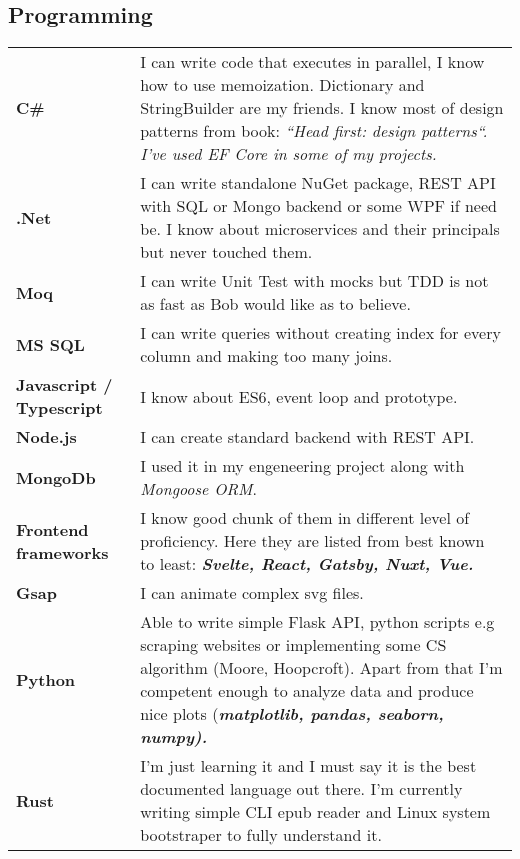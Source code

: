 \documentclass[10pt]{article}
\renewcommand{\arraystretch}{0}
\begin{document}
\subsection{Programming}
\renewcommand{\arraystretch}{2.5}
\begin{table}[H]
    \begin{tabularx}{\textwidth}{@{}l X}
         \textbf{C\#} & I can write code that executes in parallel, I know how to use memoization. Dictionary and StringBuilder are my friends. I know most of design patterns from book: \em ``Head first: design patterns``. I've used EF Core in some of my projects.\\
         \textbf{.Net} & I can write standalone NuGet package, REST API with SQL or Mongo backend or some WPF if need be. I know about microservices and their principals but never touched them. \\
         \textbf{Moq} & I can write Unit Test with mocks but TDD is not as fast as Bob would like as to believe.  \\
         \textbf{MS SQL} & I can write queries without creating index for every column and making too many joins. \\
	 \textbf{Javascript / Typescript} & I know about ES6, event loop and prototype.\\
	 \textbf{Node.js} & I can create standard backend with REST API.\\
         \textbf{MongoDb} & I used it in my engeneering project along with \emph{Mongoose ORM}. \\
         \textbf{Frontend frameworks} & I know good chunk of them in different level of proficiency. Here they are listed from best known to least: \bfseries \em Svelte, React, Gatsby, Nuxt, Vue. \\
         \textbf{Gsap} & I can animate complex svg files.\\
         \textbf{Python} & Able to write simple Flask API, python scripts e.g scraping websites or implementing some CS algorithm (Moore, Hoopcroft). Apart from that I'm competent enough to analyze data and produce nice plots (\bfseries \em matplotlib, pandas, seaborn, numpy). \\
         \textbf{Rust} & I'm just learning it and I must say it is the best documented language out there. I'm currently writing simple CLI epub reader and Linux system bootstraper to fully understand it. \\
    \end{tabularx}
\end{table}
\end{document}
